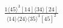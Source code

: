 \documentclass[varwidth, border=5pt]{standalone}
\begin{document}
\begin{my}
$\begin{gathered}
\scriptscriptstyle\frac{1⟨45⟩^3[14]⟨34⟩[24]}{⟨14⟩⟨24⟩⟨35⟩^3[45]^2}
\end{gathered}$
\end{my}
\end{document}
